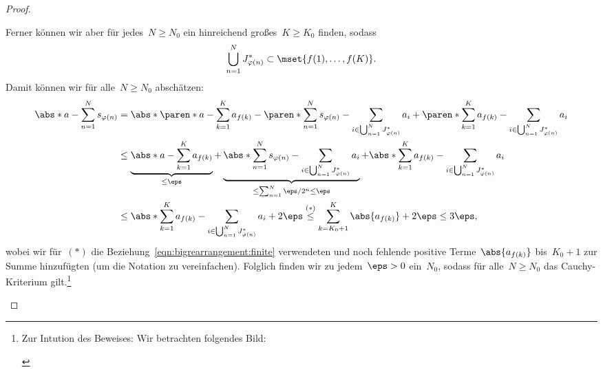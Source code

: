 \documentclass[a4paper]{article}
\begin{document}
\begin{proof}
\begin{enumerate}
              Ferner können wir aber für jedes~$N \geq N_0$ ein hinreichend großes~$K \geq K_0$ finden, sodass
              \begin{equation*}
                  \bigcup_{n=1}^N J^*_{\varphi(n)} \subset \mset{f(1),\dots,f(K)}.
              \end{equation*}
              Damit können wir für alle~$N \geq N_0$ abschätzen:
              \begin{align*}
                  \abs*{a - \sum_{n=1}^N s_{\varphi(n)}} & = \abs*{
                      \paren*{a - \sum_{k=1}^K a_{f(k)}}
                      - \paren*{\sum_{n=1}^N s_{\varphi(n)} - \sum_{i\in\bigcup_{n=1}^N J^*_{\varphi(n)}} a_i}
                  + \paren*{\sum_{k=1}^K a_{f(k)} - \sum_{i\in\bigcup_{n=1}^N J^*_{\varphi(n)}} a_i}}                                                                                                                            \\
                                                         & \leq \underbrace{\abs*{a - \sum_{k=1}^K a_{f(k)}}}_{\leq \eps}
                  + \underbrace{\abs*{\sum_{n=1}^N s_{\varphi(n)} - \sum_{i\in\bigcup_{n=1}^N J^*_{\varphi(n)}} a_i}}_{\leq \sum_{n=1}^N \eps/2^n \leq \eps}
                  + \abs*{\sum_{k=1}^K a_{f(k)} - \sum_{i\in\bigcup_{n=1}^N J^*_{\varphi(n)}} a_i}                                                                                                                               \\
                                                         & \leq \abs*{\sum_{k=1}^K a_{f(k)} - \sum_{i\in\bigcup_{n=1}^N J^*_{\varphi(n)}} a_i} + 2\eps \overset{(*)}{\leq} \sum_{k=K_0+1}^{K} \abs{a_{f(k)}} + 2\eps \leq 3\eps,
              \end{align*}
              wobei wir für~$(*)$ die Beziehung~\cref{eqn:bigrearrangement:finite} verwendeten und noch fehlende positive Terme~$\abs{a_{f(k)}}$ bis~$K_0+1$ zur Summe hinzufügten (um die Notation zu vereinfachen). Folglich finden wir zu jedem~$\eps > 0$ ein~$N_0$, sodass für alle~$N \geq N_0$ das Cauchy-Kriterium gilt.\footnote{Zur Intution des Beweises: Wir betrachten folgendes Bild:
                  \begin{center}
\end{center}}
\end{enumerate}
\end{proof}
\end{document}
